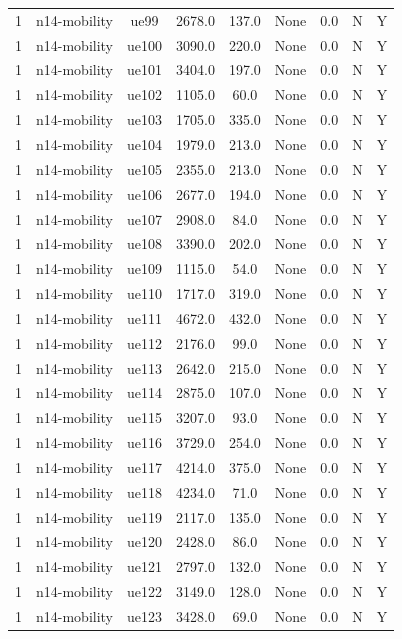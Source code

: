 \begin{table}[ht]
\begin{tabular}{|c|c|c|c|c|c|c|c|c|}
1 & n14-mobility & ue99 & 2678.0 & 137.0 & None & 0.0 & N & Y \\
1 & n14-mobility & ue100 & 3090.0 & 220.0 & None & 0.0 & N & Y \\
1 & n14-mobility & ue101 & 3404.0 & 197.0 & None & 0.0 & N & Y \\
1 & n14-mobility & ue102 & 1105.0 & 60.0 & None & 0.0 & N & Y \\
1 & n14-mobility & ue103 & 1705.0 & 335.0 & None & 0.0 & N & Y \\
1 & n14-mobility & ue104 & 1979.0 & 213.0 & None & 0.0 & N & Y \\
1 & n14-mobility & ue105 & 2355.0 & 213.0 & None & 0.0 & N & Y \\
1 & n14-mobility & ue106 & 2677.0 & 194.0 & None & 0.0 & N & Y \\
1 & n14-mobility & ue107 & 2908.0 & 84.0 & None & 0.0 & N & Y \\
1 & n14-mobility & ue108 & 3390.0 & 202.0 & None & 0.0 & N & Y \\
1 & n14-mobility & ue109 & 1115.0 & 54.0 & None & 0.0 & N & Y \\
1 & n14-mobility & ue110 & 1717.0 & 319.0 & None & 0.0 & N & Y \\
1 & n14-mobility & ue111 & 4672.0 & 432.0 & None & 0.0 & N & Y \\
1 & n14-mobility & ue112 & 2176.0 & 99.0 & None & 0.0 & N & Y \\
1 & n14-mobility & ue113 & 2642.0 & 215.0 & None & 0.0 & N & Y \\
1 & n14-mobility & ue114 & 2875.0 & 107.0 & None & 0.0 & N & Y \\
1 & n14-mobility & ue115 & 3207.0 & 93.0 & None & 0.0 & N & Y \\
1 & n14-mobility & ue116 & 3729.0 & 254.0 & None & 0.0 & N & Y \\
1 & n14-mobility & ue117 & 4214.0 & 375.0 & None & 0.0 & N & Y \\
1 & n14-mobility & ue118 & 4234.0 & 71.0 & None & 0.0 & N & Y \\
1 & n14-mobility & ue119 & 2117.0 & 135.0 & None & 0.0 & N & Y \\
1 & n14-mobility & ue120 & 2428.0 & 86.0 & None & 0.0 & N & Y \\
1 & n14-mobility & ue121 & 2797.0 & 132.0 & None & 0.0 & N & Y \\
1 & n14-mobility & ue122 & 3149.0 & 128.0 & None & 0.0 & N & Y \\
1 & n14-mobility & ue123 & 3428.0 & 69.0 & None & 0.0 & N & Y \\

\end{tabular}
\end{table}
